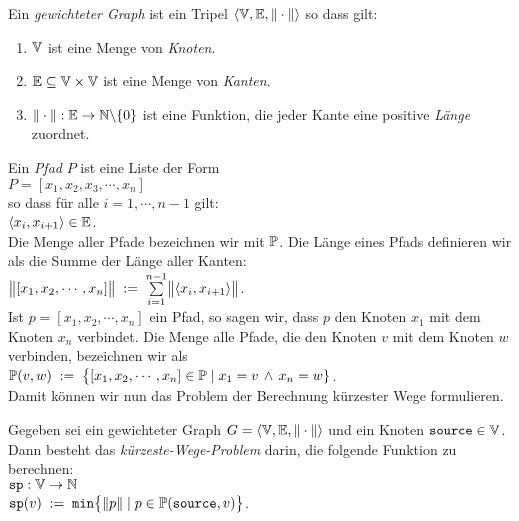 \begin{Definition} \lb
  Ein  {\em gewichteter Graph} ist ein Tripel 
   $\langle {\mathbb V}, {\mathbb E}, \|\cdot\| \rangle$ so dass gilt:
  \begin{enumerate}
  \item ${\mathbb V}$ ist eine Menge von \emph{Knoten}.
  \item ${\mathbb E} \subseteq {\mathbb V} \times {\mathbb V}$ ist eine Menge von \emph{Kanten}.
  \item $\|\cdot\|: {\mathbb E} \rightarrow {\mathbb N} \backslash\{0\}$ ist eine Funktion,
        die jeder Kante eine positive \emph{L\"ange} zuordnet.
        \conclude
  \end{enumerate}
\end{Definition}

\noindent
Ein \emph{Pfad} $P$ ist eine Liste der Form \\[0.2cm]
\hspace*{1.3cm} $P = [ x_1, x_2, x_3, \cdots, x_n ]$ \\[0.2cm]
so dass f\"ur alle $i = 1, \cdots, n-1$ gilt: \\[0.2cm]
\hspace*{1.3cm} $\pair(x_i,x_{i+1}) \in \edges$. \\[0.2cm]
Die Menge aller Pfade bezeichnen wir mit ${\mathbb P}$.
Die L\"ange eines Pfads definieren wir als die Summe der L\"ange aller Kanten:
\\[0.2cm]
\hspace*{1.3cm} $\Weight{[x_1,x_2, \cdots, x_n]} \df \sum\limits_{i=1}^{n-1} \Weight{\pair(x_i,x_{i+1})}$. \\[0.2cm]
Ist $p = [x_1, x_2, \cdots, x_n]$ ein Pfad, so sagen wir, dass $p$ den Knoten $x_1$ mit dem
Knoten $x_n$ verbindet.   Die Menge alle Pfade, die den Knoten $v$ mit dem Knoten $w$
verbinden, bezeichnen wir als \\[0.2cm]
\hspace*{1.3cm} 
 ${\mathbb P}(v,w) \;:=\; \bigl\{ [x_1, x_2, \cdots, x_n] \in {\mathbb P} \mid x_1 = v \,\wedge\, x_n = w \}$.
\\[0.2cm]
Damit k\"onnen wir nun das Problem der Berechnung k\"urzester Wege formulieren.

\begin{Definition} \lb
  Gegeben sei ein gewichteter Graph 
  $G = \langle {\mathbb V}, {\mathbb E}, \|\cdot\| \rangle$ 
  und ein  Knoten $\mbox{\tt source} \in {\mathbb V}$.  Dann besteht das 
  {\em k\"urzeste-Wege-Problem}  darin, die folgende Funktion zu berechnen: \\[0.2cm]
  \hspace*{1.3cm} $\mbox{\tt sp}: {\mathbb V} \rightarrow {\mathbb N}$ \\[0.1cm]
  \hspace*{1.3cm} $\mbox{\tt sp}(v) \;:=\; \mathtt{min}\bigl\{ \|p\| \mid p \in {\mathbb P}(\mbox{\tt source},v) \bigr\}$.
  \conclude  
\end{Definition}

